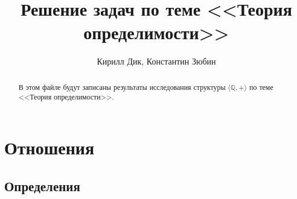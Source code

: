 \documentclass[12pt]{article}
\title{Решение задач по теме <<Теория определимости>>}
\author{Кирилл Дик, Константин Зюбин}
\theoremstyle{definition}
\begin{document}
	\maketitle

	\begin{abstract}
		В этом файле будут записаны результаты исследования структуры $ \langle \mathbb{Q}, +\rangle $ по теме <<Теория определимости>>.
	\end{abstract}  
	
	\section{Отношения}
	
	\subsection{Определения}
	
\end{document}
